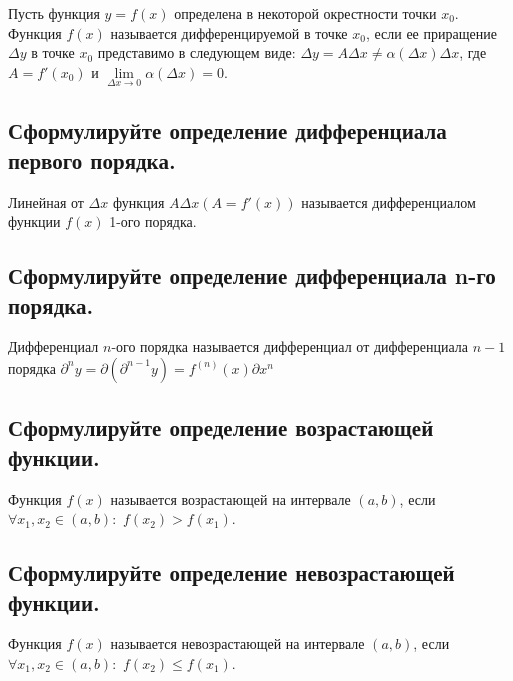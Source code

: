 Пусть функция $y = f(x)$ определена в некоторой окрестности точки $x_0$. Функция $f(x)$ называется дифференцируемой в точке $x_0$, если ее приращение $\Delta y$ в точке $x_0$ представимо в следующем виде: $\Delta y = A\Delta x \ne \alpha(\Delta x)\Delta x$, где $A = f'(x_0)$ и $\lim\limits_{\Delta x \to 0}\alpha (\Delta x) = 0$.



\subsection{Сформулируйте определение дифференциала первого порядка.}

Линейная от $\Delta x$ функция $A \Delta x (A = f'(x))$ называется дифференциалом функции $f(x)$ 1-ого порядка.



\subsection{Сформулируйте определение дифференциала n-го порядка.}

Дифференциал $n$-ого порядка называется дифференциал от дифференциала $n - 1$ порядка $\partial^ny = \partial(\partial^{n-1}y) = f^{(n)}(x)\partial x^n$


  
\subsection{Сформулируйте определение возрастающей функции.}

Функция $f(x)$ называется возрастающей на интервале $(a, b)$, если $\forall x_1, x_2 \in (a, b):$ $f(x_2)>f(x_1)$.



\subsection{Сформулируйте определение невозрастающей функции.}

Функция $f(x)$ называется невозрастающей на интервале $(a, b)$, если $\forall x_1, x_2 \in (a, b):$ $f(x_2) \leqslant f(x_1)$.

